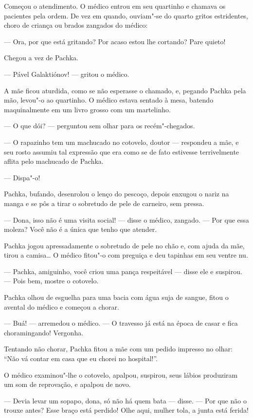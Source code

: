 Começou o atendimento. O médico entrou em seu quartinho e chamava os
pacientes pela ordem. De vez em quando, ouviam"-se do quarto gritos
estridentes, choro de criança ou brados zangados do médico:

--- Ora, por que está gritando? Por acaso estou lhe cortando? Pare
quieto!

Chegou a vez de Pachka.

--- Pável Galaktiónov! --- gritou o médico.

A mãe ficou aturdida, como se não esperasse o chamado, e, pegando Pachka
pela mão, levou"-o ao quartinho. O médico estava sentado à mesa, batendo
maquinalmente em um livro grosso com um martelinho.

--- O que dói? --- perguntou sem olhar para os recém"-chegados.

--- O rapazinho tem um machucado
no cotovelo, doutor --- respondeu a mãe, e seu rosto assumiu tal
expressão que era como se de fato estivesse terrivelmente aflita pelo
machucado de Pachka.

--- Dispa"-o!

Pachka, bufando, desenrolou o lenço do pescoço, depois enxugou o nariz
na manga e se pôs a tirar o sobretudo de pele de carneiro, sem pressa.

--- Dona, isso não é uma visita social! --- disse o médico, zangado. ---
Por que essa moleza? Você não é a única que tenho que atender.

Pachka jogou apressadamente o sobretudo de pele no chão e, com ajuda da
mãe, tirou a camisa\ldots{} O médico fitou"-o com preguiça e deu tapinhas em
seu ventre nu.

--- Pachka, amiguinho, você criou uma pança respeitável --- disse ele e
suspirou. --- Pois bem, mostre o cotovelo.

Pachka olhou de esguelha para uma bacia com água suja de sangue, fitou o
avental do médico e começou a chorar.

--- Buá! --- arremedou o médico. --- O travesso já está na época de
casar e fica choramingando! Vergonha.

Tentando não chorar, Pachka fitou a mãe com um pedido impresso no olhar:
``Não vá contar em casa que eu chorei no hospital!''.

O médico examinou"-lhe o cotovelo, apalpou, suspirou, seus lábios
produziram um som de reprovação, e apalpou de novo.

--- Devia levar um sopapo, dona, só não há quem bata --- disse. --- Por
que não o trouxe antes? Esse braço está perdido! Olhe aqui, mulher tola,
a junta está ferida!

